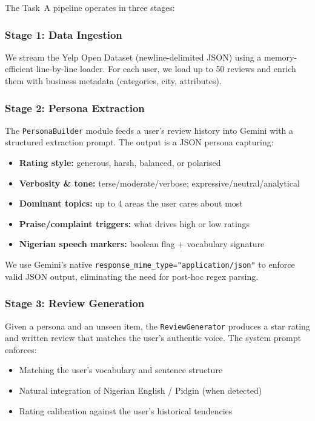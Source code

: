 \documentclass[11pt, a4paper]{article}
\begin{document}
The Task~A pipeline operates in three stages:

\subsubsection{Stage 1: Data Ingestion}
We stream the Yelp Open Dataset (newline-delimited JSON) using a memory-efficient line-by-line loader. For each user, we load up to 50 reviews and enrich them with business metadata (categories, city, attributes).

\subsubsection{Stage 2: Persona Extraction}
The \texttt{PersonaBuilder} module feeds a user's review history into Gemini with a structured extraction prompt. The output is a JSON persona capturing:

\begin{itemize}[leftmargin=2em]
    \item \textbf{Rating style:} generous, harsh, balanced, or polarised
    \item \textbf{Verbosity \& tone:} terse/moderate/verbose; expressive/neutral/analytical
    \item \textbf{Dominant topics:} up to 4 areas the user cares about most
    \item \textbf{Praise/complaint triggers:} what drives high or low ratings
    \item \textbf{Nigerian speech markers:} boolean flag + vocabulary signature
\end{itemize}

We use Gemini's native \texttt{response\_mime\_type="application/json"} to enforce valid JSON output, eliminating the need for post-hoc regex parsing.

\subsubsection{Stage 3: Review Generation}
Given a persona and an unseen item, the \texttt{ReviewGenerator} produces a star rating and written review that matches the user's authentic voice. The system prompt enforces:
\begin{itemize}[leftmargin=2em]
    \item Matching the user's vocabulary and sentence structure
    \item Natural integration of Nigerian English / Pidgin (when detected)
    \item Rating calibration against the user's historical tendencies
\end{itemize}
\end{document}
